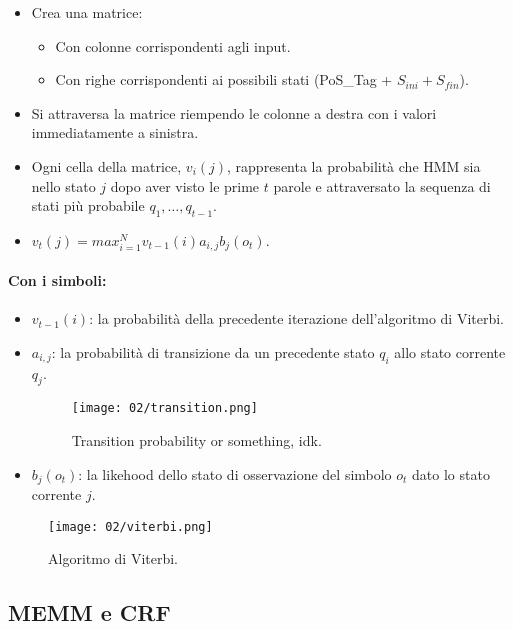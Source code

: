 \begin{itemize}
  \item Crea una matrice:
    \begin{itemize}
      \item Con colonne corrispondenti agli input. 
      \item Con righe corrispondenti ai possibili stati (PoS\_Tag + $S_{ini} + S_{fin}$).
    \end{itemize}
  \item Si attraversa la matrice riempendo le colonne a destra con i valori immediatamente a sinistra. 
  \item Ogni cella della matrice, $v_i(j)$, rappresenta la probabilità che HMM sia nello stato $j$ dopo aver visto le prime $t$ parole e attraversato la sequenza di stati più probabile $q_1, \dots, q_{t-1}$. 
  \item $v_t(j) = max_{i=1}^N v_{t-1}(i) a_{i,j} b_j (o_t)$.
\end{itemize}
\pagebreak
\paragraph{Con i simboli:}

  \begin{itemize}
    \item $v_{t-1}(i)$: la probabilità della precedente iterazione dell'algoritmo di Viterbi. 
    \item $a_{i,j}$: la probabilità di transizione da un precedente stato $q_i$ allo stato corrente $q_j$. 
      \begin{figure}[h]
    \centering
    \texttt{[image: 02/transition.png]}
    \caption{Transition probability or something, idk.}
\end{figure}
\item $b_j(o_t)$: la likehood dello stato di osservazione del simbolo $o_t$ dato lo stato corrente $j$.
  \end{itemize}

\begin{figure}[h]
    \centering
    \texttt{[image: 02/viterbi.png]}
    \caption{Algoritmo di Viterbi.}
\end{figure}


\subsection{MEMM e CRF}








